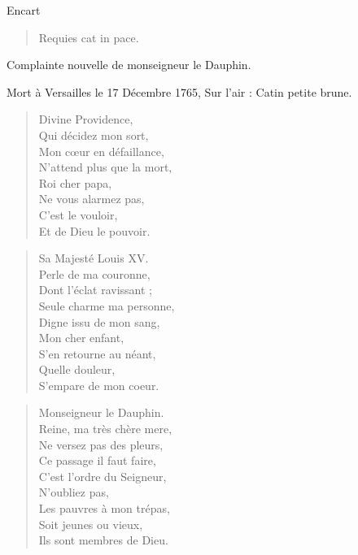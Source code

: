 \begin{diary}{Encart}{}
        \begin{verse}Requies cat in pace.\\\end{verse}
        \bigskip
        
        \begin{Large} Complainte nouvelle
                              de monseigneur le Dauphin.
                           \end{Large}\bigskip
                
                         Mort à Versailles
                              le 17 Décembre 1765, Sur l'air : Catin
                              petite brune. \bigskip
        
        \begin{verse}Divine Providence,\\Qui décidez mon sort,\\Mon cœur en défaillance,\\N'attend plus que la mort,\\Roi cher papa,\\Ne vous alarmez pas,\\C’est le vouloir,\\Et de Dieu le pouvoir.\\\end{verse}
        \bigskip
        
        \begin{verse}Sa Majesté Louis XV.\\Perle de ma couronne,\\Dont l'éclat ravissant ;\\Seule charme ma personne,\\Digne issu de mon sang,\\Mon cher enfant,\\S'en retourne au néant,\\Quelle douleur,\\S'empare de mon coeur.\\\end{verse}
        \bigskip
        
        \begin{verse}Monseigneur le Dauphin.\\Reine, ma très chère
                                    mere,\\Ne versez pas des pleurs,\\Ce passage il faut faire,\\C'est l’ordre du Seigneur,\\N’oubliez pas,\\Les pauvres à mon trépas,\\Soit jeunes ou vieux,\\Ils sont membres de Dieu.\\\end{verse}
        \bigskip
        

\end{diary}
